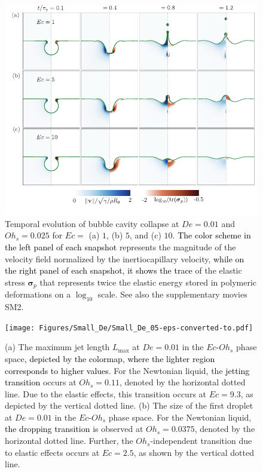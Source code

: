\documentclass{jfm}
\newcommand{\VS}[1]{{\textcolor{black}{#1}}}
\newcommand{\AO}[1]{{\textcolor{black}{#1}}}
\newcommand{\AKD}[1]{{\textcolor{black}{#1}}}
\begin{document}
\begin{figure}
	\centering
	\includegraphics[width=\textwidth]{Figures/Facets_time_Oh_LowDe/Facets_time_Oh_LowDe_08-eps-converted-to.pdf}
	\caption{Temporal evolution of bubble cavity collapse at $De = 0.01$ and $Oh_s = 0.025$ for $Ec =$ (a) $1$, (b) $5$, and (c) $10$. \AO{The color scheme in the left panel of each snapshot} represents the magnitude of the velocity field normalized by the inertiocapillary velocity, \AO{while on the right panel of each snapshot, it shows the trace} of the elastic stress $\boldsymbol{\sigma}_p$ that represents twice the elastic energy stored in polymeric deformations on a $\log_{10}$ scale. See also the supplementary movies SM2.}
	\label{factes-LowDe}
\end{figure}

\begin{figure}
	\centering
	\texttt{[image: Figures/Small\_De/Small\_De\_05-eps-converted-to.pdf]}
	\caption{(a) The maximum jet length $L_{\text{max}}$ at $De = 0.01$ in the $Ec$-$Oh_s$ phase space\AKD{, depicted by the colormap, where the lighter region corresponds to higher values}. For the Newtonian liquid, the \VS{jetting transition} occurs at $Oh_s = 0.11$, denoted by the horizontal dotted line. Due to the elastic effects, this transition occurs at $Ec = 9.3$, as depicted by the vertical dotted line. (b) The size of the first droplet at $De = 0.01$ in the $Ec$-$Oh_s$ phase space. For the Newtonian liquid, \VS{the dropping transition} is observed at $Oh_s = 0.0375$, denoted by the horizontal dotted line. Further, the $Oh_s$-independent transition due to elastic effects occurs at $Ec= 2.5$, as shown by the vertical dotted line.}
	\label{smallDe}
\end{figure}
\end{document}
